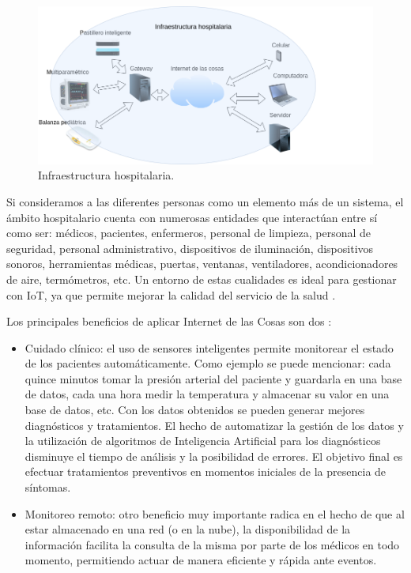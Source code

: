 \begin{figure}[ht]
	\centering
	\includegraphics[scale=.43]{./Figures/InfraestructuraHospi.png}
	\caption{Infraestructura hospitalaria.}
	\label{fig:Infraestructura Hospitalaria}
\end{figure}



Si consideramos a las diferentes personas como un elemento más de un sistema, el ámbito hospitalario cuenta con numerosas entidades que interactúan entre sí como ser: médicos, pacientes, enfermeros, personal de limpieza, personal de seguridad, personal administrativo, dispositivos de iluminación, dispositivos   sonoros, herramientas médicas, puertas, ventanas, ventiladores, acondicionadores de aire, termómetros, etc. Un entorno de estas cualidades es ideal para gestionar con IoT, ya que permite mejorar la calidad del servicio de la salud \citep{ARTICLE:1}.


Los principales beneficios de aplicar Internet de las Cosas son dos \citep{ARTICLE:1}:
\begin{itemize}
\item Cuidado clínico: el uso de sensores inteligentes permite monitorear el estado de los pacientes automáticamente. Como ejemplo se puede mencionar: cada quince minutos tomar la presión arterial del paciente y guardarla en una base de datos, cada una hora medir la temperatura y almacenar su valor en una base de datos, etc. Con los datos obtenidos se pueden generar mejores diagnósticos y tratamientos. El hecho de automatizar la gestión de los datos y la utilización de algoritmos de Inteligencia Artificial para los diagnósticos disminuye el tiempo de análisis y la posibilidad de errores. El objetivo final es  efectuar tratamientos preventivos en momentos iniciales de la presencia de síntomas.
\item Monitoreo remoto: otro beneficio muy importante radica en el hecho de que al estar almacenado en una red (o en la nube), la disponibilidad de la información facilita la consulta de la misma por parte de los médicos en todo momento, permitiendo actuar de manera eficiente y rápida ante eventos.
\end{itemize}



